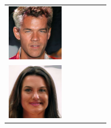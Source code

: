 \documentclass{article}
\newcommand{\pganw}{0.95in}
\begin{document}
\begin{table}[htbp]
\begin{center}
\begin{tabular}{cc|cc|cc}
\includegraphics[width=\pganw]{figures/pgan/51_base_iso_MH.jpg} \\
\includegraphics[width=\pganw]{figures/pgan/52_base_iso_base.jpg} &

\end{tabular}
\end{center}
\end{table}
\end{document}
